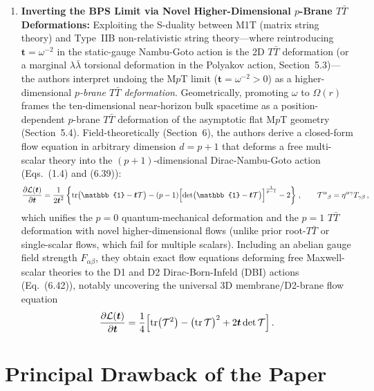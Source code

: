 \documentclass[11pt,a4paper]{article}
\newcommand{\lambdap}{\boldsymbol{t}}
\newcommand{\tr}{\operatorname{tr}}
\begin{document}
\begin{enumerate}[label=(\alph*),leftmargin=1.8em]
    \item \textbf{Inverting the BPS Limit via Novel Higher-Dimensional $p$-Brane $T\bar{T}$ Deformations:}
    Exploiting the S-duality between M1T (matrix string theory) and Type~IIB non-relativistic string theory---where reintroducing $\lambdap = \omega^{-2}$ in the static-gauge Nambu-Goto action is the 2D $T\bar{T}$ deformation (or a marginal $\lambda\bar{\lambda}$ torsional deformation in the Polyakov action, Section~5.3)---the authors interpret undoing the M$p$T limit ($\lambdap = \omega^{-2} > 0$) as a higher-dimensional \emph{$p$-brane $T\bar{T}$ deformation}. Geometrically, promoting $\omega$ to $\mathbb{\Omega}(r)$ frames the ten-dimensional near-horizon bulk spacetime as a position-dependent $p$-brane $T\bar{T}$ deformation of the asymptotic flat M$p$T geometry (Section~5.4). Field-theoretically (Section~6), the authors derive a closed-form flow equation in arbitrary dimension $d = p+1$ that deforms a free multi-scalar theory into the $(p+1)$-dimensional Dirac-Nambu-Goto action (Eqs.~(1.4) and (6.39)):
    \begin{equation}\label{eq:scalar_flow}
        \frac{\partial \mathcal{L}(\lambdap)}{\partial \lambdap} = \frac{1}{2\lambdap^2}\left\{\tr\bigl(\mathbb{1} - \lambdap\mathcal{T}\bigr) - (p-1)\Bigl[\det\bigl(\mathbb{1} - \lambdap\mathcal{T}\bigr)\Bigr]^{\frac{1}{p-1}} - 2\right\}\,, \qquad \mathcal{T}^{\alpha}{}_{\beta} = \eta^{\alpha\gamma}T_{\gamma\beta}\,,
    \end{equation}
    which unifies the $p=0$ quantum-mechanical deformation and the $p=1$ $T\bar{T}$ deformation with novel higher-dimensional flows (unlike prior root-$T\bar{T}$ or single-scalar flows, which fail for multiple scalars). Including an abelian gauge field strength $F_{\alpha\beta}$, they obtain exact flow equations deforming free Maxwell-scalar theories to the D1 and D2 Dirac-Born-Infeld (DBI) actions (Eq.~(6.42)), notably uncovering the universal 3D membrane/D2-brane flow equation
    \begin{equation}\label{eq:m2_flow}
        \frac{\partial \mathcal{L}(\lambdap)}{\partial \lambdap} = \frac{1}{4}\Bigl[\tr\bigl(\mathcal{T}^2\bigr) - \bigl(\tr\mathcal{T}\bigr)^2 + 2\lambdap\det\mathcal{T}\Bigr]\,.
    \end{equation}
\end{enumerate}

\section{Principal Drawback of the Paper}
\end{document}
